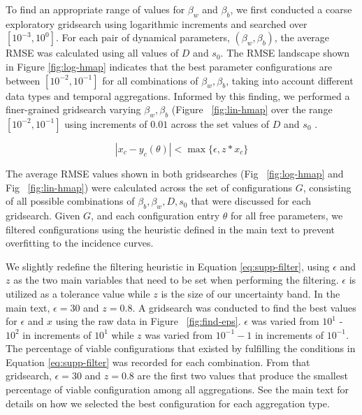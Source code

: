 \documentclass[a4paper,aps,superscriptaddress,floatfix,nofootinbib,longbibliography, onecolumn]{revtex4-1}
\begin{document}
    To find an appropriate range of values for $\beta_w$ and $\beta_b$,  we first conducted a coarse exploratory gridsearch using logarithmic increments and searched over $[10^{-3},10^0]$. For each pair of  dynamical parameters, $(\beta_w,\beta_b)$,  the average RMSE was calculated using all values of $D$ and $s_0$. The RMSE landscape shown in Figure \ref{fig:log-hmap} indicates that the best parameter configurations are between $[10^{-2}, 10^{-1}]$ for all combinations of $\beta_w,\beta_b$, taking into account different data types and temporal aggregations. Informed by this finding, we performed a finer-grained gridsearch varying $\beta_w,\beta_b$ (Figure ~\ref{fig:lin-hmap}  over the range $[10^{-2}, 10^{-1}]$ using increments of $0.01$ across the set values of $D$ and $s_0$ . 

    \begin{equation}
         |x_c - y_c(\theta)| < \max \{ \epsilon, z* x_c \}
         \label{eq:supp-filter}
    \end{equation}
    
    The average RMSE values shown in both gridsearches (Fig ~\ref{fig:log-hmap} and Fig ~\ref{fig:lin-hmap}) were calculated across the set of configurations $G$, consisting of all possible combinations of $\beta_b,\beta_w,D,s_0$ that were discussed for each gridsearch.  Given $G$, and each configuration entry $\theta$  for all free parameters, we  filtered  configurations using the heuristic defined in the main text to prevent overfitting to the incidence curves.
    
    
    We slightly redefine the filtering heuristic in Equation \ref{eq:supp-filter}, using $\epsilon$ and $z$ as the two main variables that need to be set when performing the filtering. $\epsilon$ is utilized as a tolerance value while $z$ is the size of our uncertainty band. In the main text,  $\epsilon = 30$ and $z = 0.8$. A gridsearch was conducted to find the best values for $\epsilon$ and $x$  using the raw data in Figure ~\ref{fig:find-eps}. $\epsilon$ was varied from $10^{1}$ - $10^{2}$ in increments of $10^{1}$ while $z$ was varied from $10^{-1} - 1$ in increments of $10^{-1}$. The percentage of viable configurations that existed by fulfilling the conditions in Equation \ref{eq:supp-filter} was recorded for each combination. From that gridsearch, $\epsilon=30$ and $z=0.8$ are the first two values that produce the smallest percentage of viable configuration among all aggregations. See the main text for details on how we selected the best configuration for each aggregation type. 
\end{document}
